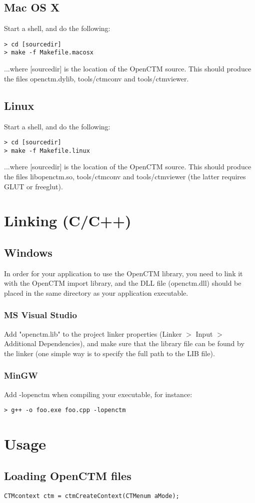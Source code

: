 \section{Mac OS X}
Start a shell, and do the following:

\begin{lstlisting}
> cd [sourcedir]
> make -f Makefile.macosx
\end{lstlisting}

...where [sourcedir] is the location of the OpenCTM source. This should produce the
files openctm.dylib, tools/ctmconv and tools/ctmviewer.


\section{Linux}
Start a shell, and do the following:

\begin{lstlisting}
> cd [sourcedir]
> make -f Makefile.linux
\end{lstlisting}

...where [sourcedir] is the location of the OpenCTM source. This should produce the
files libopenctm.so, tools/ctmconv and tools/ctmviewer (the latter requires GLUT
or freeglut).


\chapter{Linking (C/C++)}

\section{Windows}
In order for your application to use the OpenCTM library, you need to link it with
the OpenCTM import library, and the DLL file (openctm.dll) should be placed in the
same directory as your application executable.

\subsection{MS Visual Studio}
Add "openctm.lib" to the project linker properties (Linker $>$ Input $>$ Additional Dependencies),
and make sure that the library file can be found by the linker (one simple way is to
specify the full path to the LIB file).

\subsection{MinGW}
Add -lopenctm when compiling your executable, for instance:

\begin{lstlisting}
> g++ -o foo.exe foo.cpp -lopenctm
\end{lstlisting}



\chapter{Usage}

\section{Loading OpenCTM files}
\begin{lstlisting}
CTMcontext ctm = ctmCreateContext(CTMenum aMode);
\end{lstlisting}


